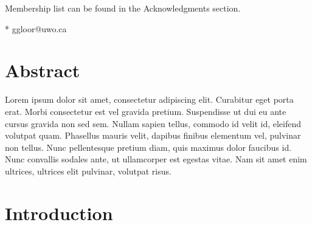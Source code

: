 \documentclass[10pt,letterpaper]{article}
\begin{document}
\begin{flushleft}



\textpilcrow Membership list can be found in the Acknowledgments section.

* ggloor@uwo.ca

\end{flushleft}
\section*{Abstract}
Lorem ipsum dolor sit amet, consectetur adipiscing elit. Curabitur eget porta erat. Morbi consectetur est vel gravida pretium. Suspendisse ut dui eu ante cursus gravida non sed sem. Nullam sapien tellus, commodo id velit id, eleifend volutpat quam. Phasellus mauris velit, dapibus finibus elementum vel, pulvinar non tellus. Nunc pellentesque pretium diam, quis maximus dolor faucibus id. Nunc convallis sodales ante, ut ullamcorper est egestas vitae. Nam sit amet enim ultrices, ultrices elit pulvinar, volutpat risus.


\linenumbers

\section*{Introduction}
\end{document}
